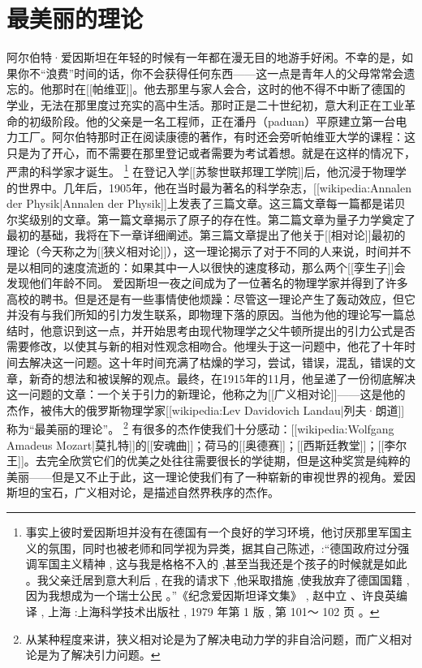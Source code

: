 	\chapter{最美丽的理论}
\indent

    阿尔伯特·爱因斯坦在年轻的时候有一年都在漫无目的地游手好闲。不幸的是，如果你不“浪费”时间的话，你不会获得任何东西——这一点是青年人的父母常常会遗忘的。他那时在[[帕维亚]]。他去那里与家人会合，这时的他不得不中断了德国的学业，无法在那里度过充实的高中生活。那时正是二十世纪初，意大利正在工业革命的初级阶段。他的父亲是一名工程师，正在潘丹（paduan）平原建立第一台电力工厂。阿尔伯特那时正在阅读康德的著作，有时还会旁听帕维亚大学的课程：这只是为了开心，而不需要在那里登记或者需要为考试着想。就是在这样的情况下，严肃的科学家才诞生。
\footnote[1]
{
事实上彼时爱因斯坦并没有在德国有一个良好的学习环境，他讨厌那里军国主义的氛围，同时也被老师和同学视为异类，据其自己陈述，:“德国政府过分强调军国主义精神 , 这与我是格格不入的 ,甚至当我还是个孩子的时候就是如此 。我父亲迁居到意大利后 , 在我的请求下 ,他采取措施 ,使我放弃了德国国籍 , 因为我想成为一个瑞士公民 。”《纪念爱因斯坦译文集》 , 赵中立 、许良英编译 , 上海 :上海科学技术出版社 , 1979 年第 1 版 , 第 101～ 102 页 。
}
    在登记入学[[苏黎世联邦理工学院]]后，他沉浸于物理学的世界中。几年后，1905年，他在当时最为著名的科学杂志，[[wikipedia:Annalen der Physik|Annalen der Physik]]上发表了三篇文章。这三篇文章每一篇都是诺贝尔奖级别的文章。第一篇文章揭示了原子的存在性。第二篇文章为量子力学奠定了最初的基础，我将在下一章详细阐述。第三篇文章提出了他关于[[相对论]]最初的理论（今天称之为[[狭义相对论]]），这一理论揭示了对于不同的人来说，时间并不是以相同的速度流逝的：如果其中一人以很快的速度移动，那么两个[[孪生子]]会发现他们年龄不同。
    爱因斯坦一夜之间成为了一位著名的物理学家并得到了许多高校的聘书。但是还是有一些事情使他烦躁：尽管这一理论产生了轰动效应，但它并没有与我们所知的引力发生联系，即物理下落的原因。当他为他的理论写一篇总结时，他意识到这一点，并开始思考由现代物理学之父牛顿所提出的引力公式是否需要修改，以使其与新的相对性观念相吻合。他埋头于这一问题中，他花了十年时间去解决这一问题。这十年时间充满了枯燥的学习，尝试，错误，混乱，错误的文章，新奇的想法和被误解的观点。最终，在1915年的11月，他呈递了一份彻底解决这一问题的文章：一个关于引力的新理论，他称之为[[广义相对论]]——这是他的杰作，被伟大的俄罗斯物理学家[[wikipedia:Lev Davidovich Landau|列夫·朗道]]称为“最美丽的理论”。
\footnote[2]
{
从某种程度来讲，狭义相对论是为了解决电动力学的非自洽问题，而广义相对论是为了解决引力问题。
}
    有很多的杰作使我们十分感动：[[wikipedia:Wolfgang Amadeus Mozart|莫扎特]]的[[安魂曲]]；荷马的[[奥德赛]]；[[西斯廷教堂]]；[[李尔王]]。去完全欣赏它们的优美之处往往需要很长的学徒期，但是这种奖赏是纯粹的美丽——但是又不止于此，这一理论使我们有了一种崭新的审视世界的视角。爱因斯坦的宝石，广义相对论，是描述自然界秩序的杰作。
